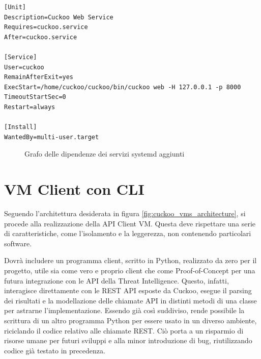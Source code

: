 \begin{code}
\begin{verbatim}
[Unit]
Description=Cuckoo Web Service
Requires=cuckoo.service
After=cuckoo.service

[Service]
User=cuckoo
RemainAfterExit=yes
ExecStart=/home/cuckoo/cuckoo/bin/cuckoo web -H 127.0.0.1 -p 8000
TimeoutStartSec=0
Restart=always

[Install]
WantedBy=multi-user.target
\end{verbatim}
\label{lst:systemd-unit-example}
\caption{Esempio di systemd unit per il servizio Web}
\end{code}
\bigskip

\begin{figure}[htbp]
\centering
{}
\caption{Grafo delle dipendenze dei servizi systemd aggiunti}
\label{fig:systemd-cuckoo-dependency-graph}
\end{figure}

\section{VM Client con CLI}
\label{sez:dynamic-python-client-vm}
Seguendo l'architettura desiderata in figura \ref{fig:cuckoo_vms_architecture},
si procede alla realizzazione della API Client VM.
Questa deve rispettare una serie di caratteristiche, come l'isolamento e la leggerezza, non contenendo particolari software.

Dovrà includere un programma client, scritto in Python, realizzato da zero per il progetto, utile sia come vero e proprio client che come Proof-of-Concept per una futura integrazione con le API della Threat Intelligence. Questo, infatti, interagisce direttamente con le REST API esposte da Cuckoo, esegue il parsing dei risultati e la modellazione delle chiamate API in distinti metodi di una classe per astrarne l'implementazione.
Essendo già così suddiviso, rende possibile la scrittura di un altro programma Python per essere usato in un diverso ambiente, riciclando il codice relativo alle chiamate REST. Ciò porta a un risparmio di risorse umane per futuri sviluppi e alla minor introduzione di bug, riutilizzando codice già testato in precedenza.

